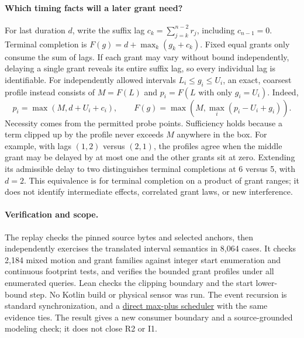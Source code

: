 \documentclass{article}
\begin{document}
\paragraph{Which timing facts will a later grant need?}
For last duration \(d\), write the suffix lag \(c_k=\sum_{j=k}^{n-2}r_j\), including \(c_{n-1}=0\). Terminal completion is \(F(g)=d+\max_k(g_k+c_k)\). Fixed equal grants only consume the sum of lags. If each grant may vary without bound independently, delaying a single grant reveals its entire suffix lag, so every individual lag is identifiable. For independently allowed intervals \(L_i\le g_i\le U_i\), an exact, coarsest profile instead consists of \(M=F(L)\) and \(p_i=F(L\text{ with only }g_i=U_i)\). Indeed,
\[
   p_i=\max(M,d+U_i+c_i),\qquad
   F(g)=\max\left(M,\max_i(p_i-U_i+g_i)\right).
\]
Necessity comes from the permitted probe points. Sufficiency holds because a term clipped up by the profile never exceeds \(M\) anywhere in the box. For example, with lags \((1,2)\) versus \((2,1)\), the profiles agree when the middle grant may be delayed by at most one and the other grants sit at zero. Extending its admissible delay to two distinguishes terminal completions at 6 versus 5, with \(d=2\). This equivalence is for terminal completion on a product of grant ranges; it does not identify intermediate effects, correlated grant laws, or new interference.

\paragraph{Verification and scope.}
The replay checks the pinned source bytes and selected anchors, then independently exercises the translated interval semantics in 8,064 cases. It checks 2,184 mixed motion and grant families against integer start enumeration and continuous footprint tests, and verifies the bounded grant profiles under all enumerated queries. Lean checks the clipping boundary and the start lower-bound step. No Kotlin build or physical sensor was run. The event recursion is standard synchronization, and a \href{https://www.rocq.inria.fr/metalau/cohen/SED/book-online.html}{direct max-plus scheduler} with the same evidence ties. The result gives a new consumer boundary and a source-grounded modeling check; it does not close R2 or I1.
\end{document}
